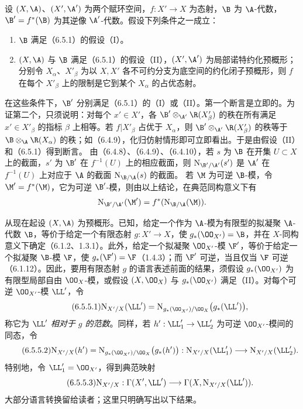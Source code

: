 设 $(X,\A)$、$(X',\A')$ 为两个赋环空间，$f:X'\to X$ 为态射，$\B$ 为 $\A$-代数，$\B'=f^*(\B)$ 为其逆像 $\A'$-代数。假设下列条件之一成立：
\begin{enumerate}[label=\arabic*\textsuperscript{o}]
\item $\B$ 满足（6.5.1）的假设（I）。
\item $(X,\A)$ 与 $\B$ 满足（6.5.1）的假设（II），$(X',\A')$ 为局部诺特约化预概形；分别令 $X_\alpha$、$X'_\beta$ 为以 $X,X'$ 各不可约分支为底空间的约化闭子预概形，则 $f$ 在每个 $X'_\beta$ 上的限制是它到某个 $X_\alpha$ 的占优态射。
\end{enumerate}
在这些条件下，$\B'$ 分别满足（6.5.1）的（I）或（II）。第一个断言是立即的。为证第二个，只须说明：对每个 $x'\in X'$，各 $\B'\otimes_{\A'}\R(X'_\beta)$ 的秩在所有满足 $x'\in X'_\beta$ 的指标 $\beta$ 上相等。若 $f|X'_\beta$ 占优于 $X_\alpha$，则 $\B'\otimes_{\A'}\R(X'_\beta)$ 的秩等于 $\B\otimes_\A\R(X_\alpha)$ 的秩；如（6.4.9），化归仿射情形即可立即看出。于是由假设（II）和（6.5.1）得到断言。
由（6.4.8）、（6.4.9）、（6.4.10），若 $s$ 为 $\B$ 在开集 $U\subset X$ 上的截面，$s'$ 为 $\B'$ 在 $f^{-1}(U)$ 上的相应截面，则 $\mathrm N_{\B'/\A'}(s')$ 是 $\A'$ 在 $f^{-1}(U)$ 上对应于 $\A$ 的截面 $\mathrm N_{\B/\A}(s)$ 的截面。
若 $\M$ 为可逆 $\B$-模，令 $\M'=f^*(\M)$，它为可逆 $\B'$-模，则由以上结论，在典范同构意义下有
\[
\mathrm N_{\B'/\A'}(\M')=f^*(\mathrm N_{\B/\A}(\M)).
\]

从现在起设 $(X,\A)$ 为预概形。已知，给定一个作为 $\A$-模为有限型的拟凝聚 $\A$-代数 $\B$，等价于给定一个有限态射 $g:X'\to X$，使 $g_*(\OO_{X'})=\B$，并在 $X$-同构意义下确定（6.1.2、1.3.1）。此外，给定一个拟凝聚 $\OO_{X'}$-模 $\F'$，等价于给定一个拟凝聚 $\B$-模 $\F$，使 $g_*(\F')=\F$（1.4.3）；而 $\F'$ 可逆，当且仅当 $\F$ 可逆（6.1.12）。因此，要用有限态射 $g$ 的语言表述前面的结果，须假设 $g_*(\OO_{X'})$ 为有限型局部自由 $\OO_X$-模，或假设 $(X,\OO_X)$ 与 $g_*(\OO_{X'})$ 满足（II）。对每个可逆 $\OO_{X'}$-模 $\LL'$，令
\begin{equation}\tag{6.5.5.1}
\mathrm N_{X'/X}(\LL')=
\mathrm N_{g_*(\OO_{X'})/\OO_X}\bigl(g_*(\LL')\bigr),
\end{equation}
称它为 $\LL'$ \emph{相对于 $g$ 的范数}。同样，若 $h':\LL'_1\to\LL'_2$ 为可逆 $\OO_{X'}$-模间的同态，令
\begin{equation}\tag{6.5.5.2}
\mathrm N_{X'/X}(h')=
\mathrm N_{g_*(\OO_{X'})/\OO_X}\bigl(g_*(h')\bigr):
\mathrm N_{X'/X}(\LL'_1)\longrightarrow\mathrm N_{X'/X}(\LL'_2).
\end{equation}
特别地，令 $\LL'_1=\OO_{X'}$，得到典范映射
\begin{equation}\tag{6.5.5.3}
\mathrm N_{X'/X}:\Gamma(X',\LL')\longrightarrow
\Gamma(X,\mathrm N_{X'/X}(\LL')).
\end{equation}
大部分语言转换留给读者；这里只明确写出以下结果。

